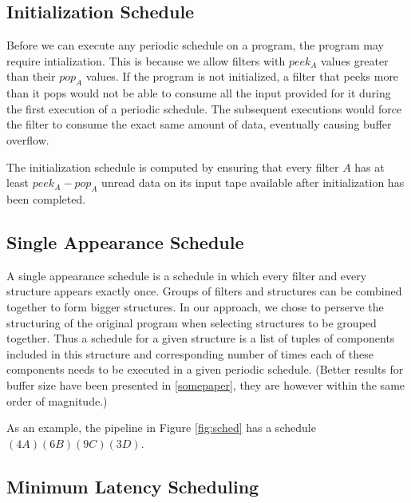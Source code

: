 \subsection{Initialization Schedule}

Before we can execute any periodic schedule on a program, the program may
require intialization.  This is because we allow filters with $peek_A$ values
greater than their $pop_A$ values.  If the program is not initialized, a filter
that peeks more than it pops would not be able to consume all the input 
provided for it during the first execution of a periodic schedule.  The
subsequent executions would force the filter to consume the exact same amount
of data, eventually causing buffer overflow.

The initialization schedule is computed by ensuring that every filter $A$ has
at least $peek_A - pop_A$ unread data on its input tape available after 
initialization has been completed.

\subsection{Single Appearance Schedule}

A single appearance schedule is a schedule in which every filter and every
structure appears exactly once.  Groups of filters and structures can be
combined together to form bigger structures.  In our approach, we chose to
perserve the structuring of the original program when selecting structures
to be grouped together.  Thus a schedule for a given structure is a list
of tuples of components included in this structure and corresponding number
of times each of these components needs to be executed in a given periodic
schedule. (Better results for buffer size have been presented in 
\ref{somepaper}, they are however within the same order of magnitude.)

As an example, the pipeline in Figure \ref{fig:sched} has a schedule
$(4A)(6B)(9C)(3D)$.

\subsection{Minimum Latency Scheduling}



